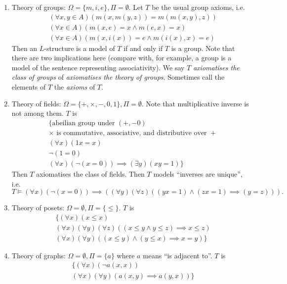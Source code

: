 \documentclass[a4paper]{article}
\begin{document}
\begin{eg}\leavevmode
  \begin{enumerate}
  \item Theory of groups: \(\Omega = \{m, i, e\}, \Pi = \emptyset\). Let \(T\) be the usual group axioms, i.e.
    \begin{align*}
      & (\forall x, y \in A) (m(x, m(y, z)) = m(m(x, y), z)) \\
      & (\forall x \in A) (m(x, e) = x \land m(e, x) = x) \\
      & (\forall x \in A) (m(x, i(x)) = e \land m(i(x), x) = e)
    \end{align*}
    Then an \(L\)-structure is a model of \(T\) if and only if \(T\) is a group. Note that there are two implications here (compare with, for example, a group is a model of the sentence representing associativity). We say \(T\) \emph{axiomatises the class of groups} of \emph{axiomatises the theory of groups}. Sometimes call the elements of \(T\) the \emph{axioms} of \(T\).
  \item Theory of fields: \(\Omega = \{+, \times, -, 0, 1\}, \Pi = \emptyset\). Note that multiplicative inverse is not among them. \(T\) is
    \begin{align*}
      & \{ \text{abeilian group under } (+, - 0) \\
      & \times \text{ is commutative, associative, and distributive over } + \\
      & (\forall x) (1x = x) \\
      & \neg (1 = 0) \\
      & (\forall x) (\neg(x = 0)) \implies (\exists y)(xy = 1) \}
    \end{align*}
    Then \(T\) axiomatises the class of fields. Then \(T\) models ``inverses are unique'', i.e.
    \[
      T \models (\forall x) (\neg (x = 0)) \implies ((\forall y) (\forall z) ((yx = 1) \land (zx = 1) \implies (y = z))).
    \]
  \item Theory of posets: \(\Omega = \emptyset, \Pi = \{\leq\}\). \(T\) is
    \begin{align*}
      & \{ (\forall x) (x \leq x) \\
      & (\forall x) (\forall y) (\forall z) ((x \leq y \land y \leq z) \implies x \leq z) \\
      & (\forall x) (\forall y) ((x \leq y) \land (y \leq x) \implies x = y) \}
    \end{align*}
  \item Theory of graphs: \(\Omega = \emptyset, \Pi = \{a\}\) where \(a\) means ``is adjacent to''. \(T\) is
    \begin{align*}
      & \{ (\forall x) (\neg a(x, x)) \\
      & (\forall x) (\forall y) (a(x, y) \implies a(y, x)) \}
    \end{align*}
  \end{enumerate}
\end{eg}
\end{document}
